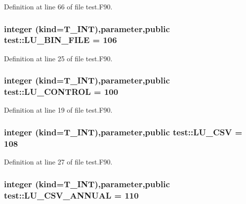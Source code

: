 Definition at line 66 of file test.F90.

\hypertarget{namespacetest_ad2384d4c6037155a8ec2549d1d0bcfe4}{
\subsubsection[{LU\_\-BIN\_\-FILE}]{\setlength{\rightskip}{0pt plus 5cm}integer (kind={\bf T\_\-INT}),parameter,public {\bf test::LU\_\-BIN\_\-FILE} = 106}}
\label{namespacetest_ad2384d4c6037155a8ec2549d1d0bcfe4}


Definition at line 25 of file test.F90.

\hypertarget{namespacetest_ae6a297220869ce598523186f326bef7c}{
\subsubsection[{LU\_\-CONTROL}]{\setlength{\rightskip}{0pt plus 5cm}integer (kind={\bf T\_\-INT}),parameter,public {\bf test::LU\_\-CONTROL} = 100}}
\label{namespacetest_ae6a297220869ce598523186f326bef7c}


Definition at line 19 of file test.F90.

\hypertarget{namespacetest_ad63b2c5042d42739d03ca38d8ec6f417}{
\subsubsection[{LU\_\-CSV}]{\setlength{\rightskip}{0pt plus 5cm}integer (kind={\bf T\_\-INT}),parameter,public {\bf test::LU\_\-CSV} = 108}}
\label{namespacetest_ad63b2c5042d42739d03ca38d8ec6f417}


Definition at line 27 of file test.F90.

\hypertarget{namespacetest_a37ce335b13c6fe95c470ba7b67c88f92}{
\subsubsection[{LU\_\-CSV\_\-ANNUAL}]{\setlength{\rightskip}{0pt plus 5cm}integer (kind={\bf T\_\-INT}),parameter,public {\bf test::LU\_\-CSV\_\-ANNUAL} = 110}}
\label{namespacetest_a37ce335b13c6fe95c470ba7b67c88f92}


